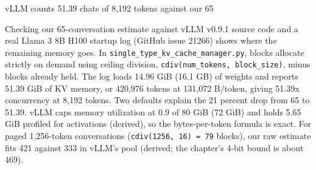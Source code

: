 \documentclass[aspectratio=169, 12pt]{beamer}
\begin{document}
\begin{frame}[t]{vLLM counts 51.39 chats of 8,192 tokens against our 65}
{    Checking our 65-conversation estimate against vLLM v0.9.1 source code and a real Llama 3 8B H100 startup log (GitHub issue 21266) shows where the remaining memory goes. In \texttt{single\_type\_kv\_cache\_manager.py}, blocks allocate strictly on demand using ceiling division, \texttt{cdiv(num\_tokens, block\_size)}, minus blocks already held. The log loads 14.96 GiB (16.1 GB) of weights and reports 51.39 GiB of KV memory, or 420,976 tokens at 131,072 B/token, giving 51.39x concurrency at 8,192 tokens. Two defaults explain the 21 percent drop from 65 to 51.39. vLLM caps memory utilization at 0.9 of 80 GiB (72 GiB) and holds 5.65 GiB profiled for activations (derived), so the bytes-per-token formula is exact. For paged 1,256-token conversations (\texttt{cdiv(1256, 16) = 79} blocks), our raw estimate fits 421 against 333 in vLLM's pool (derived; the chapter's 4-bit bound is about 469).


  }
\end{frame}
\end{document}
